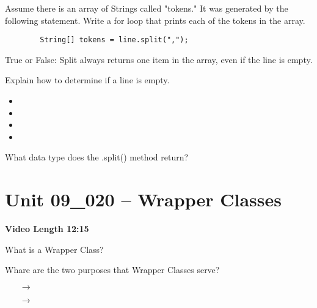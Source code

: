 \documentclass[letterpaper,12pt]{exam}
\newcommand{\unit}{Unit 09}
\begin{document}
\begin{questions}
\begin{samepage}
    \question Assume there is an array of Strings called "tokens."  It was generated by the following statement.  Write a for loop that prints each of the tokens in the array.
    \begin{verbatim}
        String[] tokens = line.split(",");
    \end{verbatim}
        
    \vspace{15mm}
\end{samepage}

\begin{samepage}
    \question True or False:  Split always returns one item in the array, even if the line is empty.
    \vspace{5mm}
\end{samepage}

\begin{samepage}
    \question Explain how to determine if a line is empty.
      \begin{itemize}
        \item 
        \vspace{5mm}
        \item 
        \vspace{5mm}
        \item 
        \vspace{5mm}
        \item 
        \vspace{5mm}
       \end{itemize}
\end{samepage}



\begin{samepage}
    \question What data type does the .split() method return?
    \vspace{5mm}
\end{samepage}


\section*{\unit\_020 -- Wrapper Classes } 
\par{\selectfont\textbf{Video Length 12:15}}
\begin{samepage}
    \question What is a Wrapper Class?
    \vspace{5mm}
\end{samepage}

\begin{samepage}
    \question Whare are the two purposes that Wrapper Classes serve?
      \begin{itemize}
        \item[$\rightarrow$]
        \vspace{5mm}
        \item[$\rightarrow$]
        \vspace{5mm}
       \end{itemize}
\end{samepage}


\end{questions}
\end{document}
